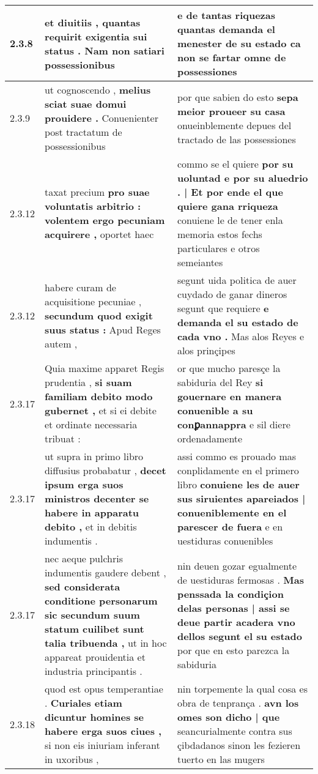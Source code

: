 \begin{tabular}{|p{1cm}|p{6.5cm}|p{6.5cm}|}
2.3.8 & et diuitiis , \textbf{ quantas requirit exigentia sui status . } Nam non satiari possessionibus & e de tantas riquezas \textbf{ quantas demanda el menester de su estado } ca non se fartar omne de possessiones \\\hline
2.3.9 & ut cognoscendo , \textbf{ melius sciat suae domui prouidere . } Conuenienter post tractatum de possessionibus & por que sabien do esto \textbf{ sepa meior proueer su casa } onueinblemente depues del tractado de las possessiones \\\hline
2.3.12 & taxat precium \textbf{ pro suae voluntatis arbitrio : volentem ergo pecuniam acquirere , } oportet haec & commo se el quiere \textbf{ por su uoluntad e por su aluedrio . | Et por ende el que quiere gana rriqueza } conuiene le de tener enla memoria estos fechs particulares e otros semeiantes \\\hline
2.3.12 & habere curam de acquisitione pecuniae , \textbf{ secundum quod exigit suus status : } Apud Reges autem , & segunt uida politica de auer cuydado de ganar dineros segunt que requiere \textbf{ e demanda el su estado de cada vno . } Mas alos Reyes e alos prinçipes \\\hline
2.3.17 & Quia maxime apparet Regis prudentia , \textbf{ si suam familiam debito modo gubernet , } et si ei debite et ordinate necessaria tribuat : & or que mucho paresçe la sabiduria del Rey \textbf{ si gouernare en manera conuenible a su conꝑannappra } e sil diere ordenadamente \\\hline
2.3.17 & ut supra in primo libro diffusius probabatur , \textbf{ decet ipsum erga suos ministros decenter se habere in apparatu debito , } et in debitis indumentis . & assi commo es prouado mas conplidamente en el primero libro \textbf{ conuiene les de auer sus siruientes apareiados | conueniblemente en el parescer de fuera } e en uestiduras conuenibles \\\hline
2.3.17 & nec aeque pulchris indumentis gaudere debent , \textbf{ sed considerata conditione personarum sic secundum suum statum cuilibet sunt talia tribuenda , } ut in hoc appareat prouidentia et industria principantis . & nin deuen gozar egualmente de uestiduras fermosas . \textbf{ Mas penssada la condiçion delas personas | assi se deue partir acadera vno dellos segunt el su estado } por que en esto parezca la sabiduria \\\hline
2.3.18 & quod est opus temperantiae . \textbf{ Curiales etiam dicuntur homines se habere erga suos ciues , } si non eis iniuriam inferant in uxoribus , & nin torpemente la qual cosa es obra de tenprança . \textbf{ avn los omes son dicho | que } seancurialmente contra sus çibdadanos sinon les fezieren tuerto en las mugers \\\hline

\end{tabular}
